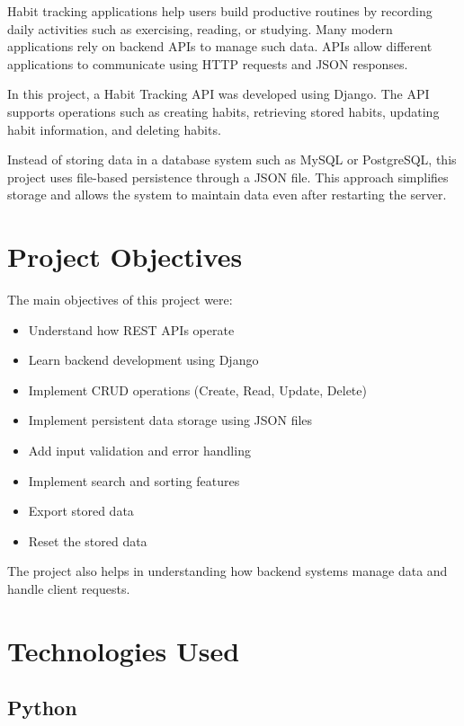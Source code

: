 \documentclass[12pt]{article}
\begin{document}
Habit tracking applications help users build productive routines by recording daily activities 
such as exercising, reading, or studying. Many modern applications rely on backend APIs to manage 
such data. APIs allow different applications to communicate using HTTP requests and JSON responses.

In this project, a Habit Tracking API was developed using Django. The API supports operations such 
as creating habits, retrieving stored habits, updating habit information, and deleting habits.

Instead of storing data in a database system such as MySQL or PostgreSQL, this project uses 
file-based persistence through a JSON file. This approach simplifies storage and allows the 
system to maintain data even after restarting the server.

\section{Project Objectives}

The main objectives of this project were:

\begin{itemize}

\item Understand how REST APIs operate
\item Learn backend development using Django
\item Implement CRUD operations (Create, Read, Update, Delete)
\item Implement persistent data storage using JSON files
\item Add input validation and error handling
\item Implement search and sorting features
\item Export stored data
\item Reset the stored data

\end{itemize}

The project also helps in understanding how backend systems manage data and handle client requests.

\section{Technologies Used}

\subsection{Python}
\end{document}
